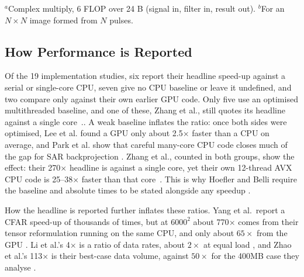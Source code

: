 \begin{table}[t]
      \smallskip
      \begin{minipage}{\columnwidth}
            \scriptsize
            $^{a}$Complex multiply, 6 FLOP over 24 B (signal in, filter in, result out).
            $^{b}$For an $N\times N$ image formed from $N$ pulses.
      \end{minipage}
\end{table}

\subsection{How Performance is Reported}
\label{sec:reporting}
Of the 19 implementation studies, six report their headline speed-up against a serial or single-core CPU,
seven give no CPU baseline or leave it undefined, and two compare only against their own earlier GPU code.
Only five use an optimised multithreaded baseline, and one of these, Zhang et al., still quotes its headline against a single core~\cite{zhangAcceleratingSpaceborneSAR2016}.. A weak baseline inflates the ratio: once both sides were optimised, Lee et al. \cite{leeDebunking100XGPU2010b} found a GPU only about 2.5$\times$ faster than a CPU on average, and Park et al. show that careful many-core CPU code closes much of the gap for SAR backprojection \cite{parkEfficientBackprojectionbasedSynthetic2012}. Zhang et al., counted in both groups, show the effect: their 270$\times$ headline is against a single core, yet their own 12-thread AVX CPU code is 25--38$\times$ faster than that core~\cite{zhangAcceleratingSpaceborneSAR2016}. This is why Hoefler
and Belli require the baseline and absolute times to be stated alongside any speedup \cite{hoeflerScientificBenchmarkingParallel2015a}.

How the headline is reported further inflates these ratios. Yang et al.\ report a CFAR speed-up of thousands of times, but at $6000^2$ about 770$\times$ comes from their tensor reformulation running on the same CPU, and only about $65\times$ from the GPU \cite{yangGPUOrientedDesignsConstant2022a}. Li et al.'s 4$\times$ is a ratio of data rates, about $2\times$ at equal load \cite{liDesignHighspeedSoftware2022a}, and Zhao et al.'s 113$\times$ is their best-case data volume, against $50\times$ for the 400MB case they analyse \cite{zhaoGPUAcceleratedSignalProcessing2023}.

